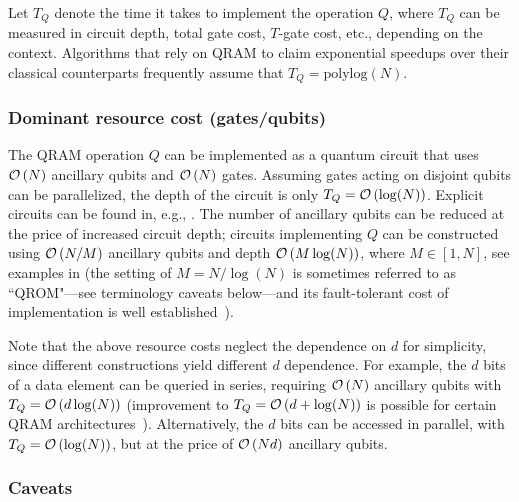 \begin{refsection}
Let $T_Q$ denote the time it takes to implement the operation $Q$, where $T_Q$ can be measured in circuit depth, total gate cost, $T$-gate cost, etc., depending on the context. Algorithms that rely on QRAM to claim exponential speedups over their classical counterparts frequently assume that $T_Q = \mathrm{polylog} (N)$. 

\subsubsection*{Dominant resource cost (gates/qubits)}

The QRAM operation $Q$ can be implemented as a quantum circuit that uses $\mathcal{O}\left( N \right)$ ancillary qubits and $\mathcal{O}\left( N \right)$ gates. Assuming gates acting on disjoint qubits can be parallelized, the depth of the circuit is only $T_Q = \mathcal{O}\left( \log(N) \right)$. Explicit circuits can be found in, e.g., \cite{dimatteo2020FaultTolerantQRAM,hann2021resilienceofQRAM}. The number of ancillary qubits can be reduced at the price of increased circuit depth; circuits implementing $Q$ can be constructed using $\mathcal{O}\left( N/M \right)$ ancillary qubits and depth $\mathcal{O}\left( M\log(N) \right)$, where $M \in [1, N]$, see examples in \cite{low2018tradingTgatesforDirtyQubits, Berry2019QubitizationOfArbitraryBasisChemistry, dimatteo2020FaultTolerantQRAM, hann2021resilienceofQRAM} (the setting of $M=N/\log(N)$ is sometimes referred to as ``QROM"---see terminology caveats below---and its fault-tolerant cost of implementation is well established~\cite{babbush2018EncodingElectronicSpectraLinearT}). 

Note that the above resource costs neglect the dependence on $d$ for simplicity, since different constructions yield different $d$ dependence. For example, the $d$ bits of a data element can be queried in series, requiring $\mathcal{O}\left( N \right)$ ancillary qubits with $T_Q = \mathcal{O}\left( d\log(N) \right)$ (improvement to $T_Q = \mathcal{O}\left( d+\log(N) \right)$ is possible for certain QRAM architectures~\cite{chen2023efficient}). Alternatively, the $d$ bits can be accessed in parallel, with $T_Q = \mathcal{O}\left( \log(N) \right)$, but at the price of $\mathcal{O}\left( Nd \right)$ ancillary qubits.


\subsubsection*{Caveats}


\end{refsection}
